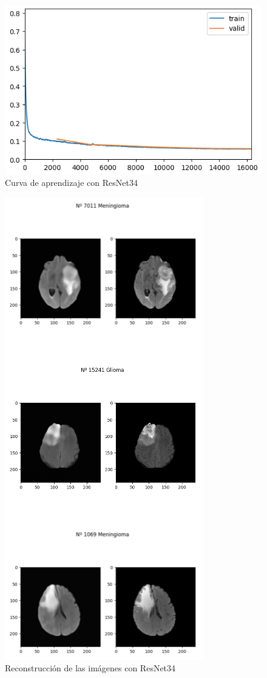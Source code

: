 \begin{figure}[H]
	\centering
	\includegraphics[width=0.8\linewidth]{imagenes/curva_resnet34.png}
	\caption{Curva de aprendizaje con ResNet34}
\end{figure}

\begin{figure}[H]
	\centering
	\includegraphics[width=0.5\linewidth]{imagenes/reconstruccion_resnet34.png}
	\caption{Reconstrucción de las imágenes con ResNet34}
\end{figure}

